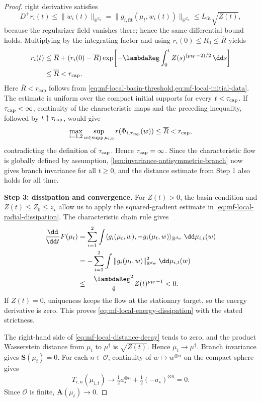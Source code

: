 \begin{proof}
right derivative satisfies
\[
 D^+r_i(t)\le\|\dot w_i(t)\|_{\mathbb R^{d_w}}
 =\|g_{i,\mathrm{fit}}(\mu_t,w_i(t))\|_{\mathbb R^{d_w}}
 \le L_{\mathrm{fit}}\sqrt{Z(t)},
\]
because the regularizer field vanishes there; hence the same differential
bound holds. Multiplying by the integrating factor and using
\(r_i(0)\le R_0\le\overline R\) yields
\[
\begin{aligned}
 r_i(t)
 &\le\overline R+(r_i(0)-\overline R)
 \exp\!\left[-\lambdaReg\int_0^t
       Z(s)^{(p_W-2)/2}\,\dd s\right]\\
 &\le\overline R<r_{\mathrm{cap}}.
\end{aligned}
\]
Here \(\overline R<r_{\mathrm{cap}}\) follows from
\cref{eq:mf-local-basin-threshold,eq:mf-local-initial-data}. The estimate is
uniform over the compact initial supports for every $t<\tau_{\rm cap}$.
If $\tau_{\rm cap}<\infty$, continuity of the characteristic maps and the
preceding inequality, followed by $t\uparrow\tau_{\rm cap}$, would give
\[
 \max_{i=1,2}\sup_{w\in\operatorname{supp}\mu_{i,0}}
 r(\Phi_{i,\tau_{\rm cap}}(w))
 \le\overline R<r_{\rm cap},
\]
contradicting the definition of $\tau_{\rm cap}$. Hence
$\tau_{\rm cap}=\infty$.
Since the characteristic flow is globally defined by assumption,
\cref{lem:invariance-antisymmetric-branch} now gives branch invariance for all
\(t\ge0\), and the distance estimate from Step 1 also holds for all time.

\par\noindent\textbf{Step 3: dissipation and convergence.}
For \(Z(t)>0\), the basin condition and \(Z(t)\le Z_0\le z_\star\) allow us
to apply the squared-gradient estimate in
\cref{eq:mf-local-radial-dissipation}. The characteristic chain rule gives
\[
\begin{aligned}
 \frac{\dd}{\dd t}F(\mu_t)
 &=\sum_{i=1}^2\int
   \langle g_i(\mu_t,w),-g_i(\mu_t,w)\rangle_{\mathbb R^{d_w}}
   \,\dd\mu_{i,t}(w)\\
 &=-\sum_{i=1}^2\int
   \|g_i(\mu_t,w)\|_{\mathbb R^{d_w}}^2\,\dd\mu_{i,t}(w)\\
 &\le-\frac{\lambdaReg^2}{4}Z(t)^{p_W-1}<0.
\end{aligned}
\]
If \(Z(t)=0\), uniqueness keeps the flow at the stationary target, so the
energy derivative is zero. This proves
\cref{eq:mf-local-energy-dissipation} with the stated strictness.

The right-hand side of \cref{eq:mf-local-distance-decay} tends to zero, and
the product Wasserstein distance from \(\mu_t\) to \(\mu^\dagger\) is
\(\sqrt{Z(t)}\). Hence \(\mu_t\to\mu^\dagger\). Branch invariance gives
\(\mathbf S(\mu_t)=0\). For each \(n\in\mathcal O\), continuity of
\(w\mapsto w^{\otimes n}\) on the compact sphere gives
\[
 T_{i,n}(\mu_{i,t})\longrightarrow
 \tfrac12a_\star^{\otimes n}+\tfrac12(-a_\star)^{\otimes n}=0.
\]
Since \(\mathcal O\) is finite, \(\mathbf A(\mu_t)\to0\).
\end{proof}
